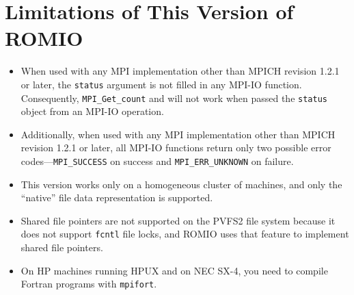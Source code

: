 %
%
\section{Limitations of This Version of ROMIO \label{sec:limit}}

\begin{itemize}
\item When used with any MPI implementation other than MPICH revision
1.2.1 or later, the {\tt status} argument is not filled in any MPI-IO
function. Consequently, {\tt MPI\_Get\_count} and will not work when passed the {\tt status} object
from an MPI-IO operation.

\item Additionally, when used with any MPI implementation other than MPICH
revision 1.2.1 or later, all MPI-IO functions return only two possible
error codes---{\tt MPI\_SUCCESS} on success and {\tt MPI\_ERR\_UNKNOWN}
on failure.

\item This version works only on a homogeneous cluster of machines,
and only the ``native'' file data representation is supported.

\item Shared file pointers are not supported on the PVFS2
file system because it does not support {\tt fcntl} file locks,
and ROMIO uses that feature to implement shared file pointers.

\item On HP machines running HPUX and on NEC SX-4, you need to compile
Fortran programs with {\tt mpifort}.

\end{itemize}


%
%

